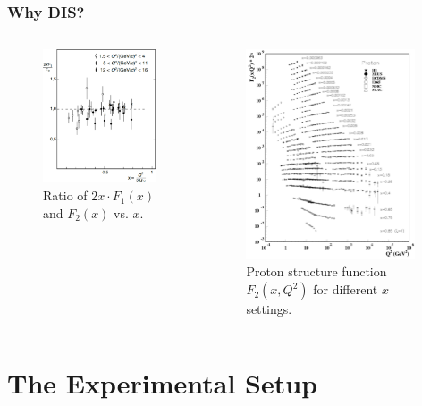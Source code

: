 \documentclass[12pt]{beamer}
\begin{document}
\begin{frame}
\frametitle{Why DIS?}
\begin{columns}[c] %
			\vspace*{-30pt}
	\begin{figure}[t]
	\centering
	\includegraphics[width=5cm]{../images/Thesis/f1_f2_spin.pdf} 
	\caption*{Ratio of $2x\cdot F_1(x)$ and $F_2(x)$ vs. $x$. \cite{PnN}}
	
\end{figure} 


\begin{figure}[t]
	\vspace*{-30pt}
	\centering
	\includegraphics[width=5cm]{../images/Thesis/SLAC_F2.png} 
	\caption*{ Proton structure function $F_2(x, Q^2)$ for different $x$ settings. \cite{Rev_PP}}
	
\end{figure} 
\end{columns}
\end{frame}

\section[Experiment]{The Experimental Setup}
\end{document}
